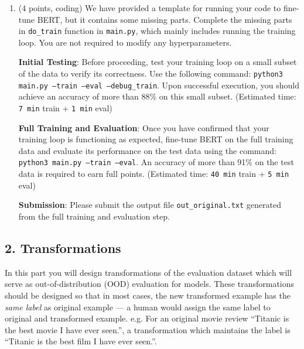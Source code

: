 \documentclass{article}
\theoremstyle{case}
\theoremstyle{definition}
\begin{document}
\begin{enumerate}
    \item (4 points, coding) We have provided a template for running your code to fine-tune BERT, but it contains some missing parts. Complete the missing parts in \texttt{do\_train} function in \texttt{main.py}, which mainly includes running the training loop. You are not required to modify any hyperparameters.

    \textbf{Initial Testing}: Before proceeding, test your training loop on a small subset of the data to verify its correctness. Use the following command:
    \texttt{python3 main.py --train --eval --debug\_train}. Upon successful execution, you should achieve an accuracy of more than 88\% on this small subset. (Estimated time: \texttt{7 min} train + \texttt{1 min} eval)

\textbf{Full Training and Evaluation}: Once you have confirmed that your training loop is functioning as expected, fine-tune BERT on the full training data and evaluate its performance on the test data using the command: \texttt{python3 main.py --train --eval}. An accuracy of more than 91\% on the test data is required to earn full points. (Estimated time: \texttt{40 min} train + \texttt{5 min} eval)

\textbf{Submission}: Please submit the output file \texttt{out\_original.txt} generated from the full training and evaluation step.






\end{enumerate}

\newpage
\subsection*{2. Transformations}

In this part you will design transformations of the evaluation dataset which will serve as out-of-distribution (OOD) evaluation for models.  These transformations should be designed so that in most cases, the new transformed example has the \emph{same label} as original example --- a human would assign the same label to original and transformed example. e.g. For an original movie review ``Titanic is the best movie I have ever seen.'', a transformation which maintains the label is ``Titanic is the best film I have ever seen.''.
\end{document}
